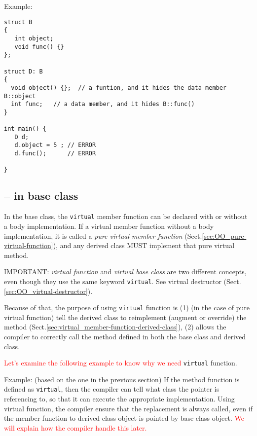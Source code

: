 Example:
\begin{lstlisting}
struct B
{
   int object;
   void func() {}
};

struct D: B
{
  void object() {};  // a funtion, and it hides the data member B::object
  int func;   // a data member, and it hides B::func()
}

int main() {
   D d; 
   d.object = 5 ; // ERROR
   d.func();      // ERROR

}
\end{lstlisting}


\subsection{ -- in base class}
\label{sec:virtual_member-function-in-base-class}

In the base class, the \verb!virtual! member function can be declared with or
without a body implementation. If a virtual member function without a body
implementation, it is called a {\it pure virtual member function}
(Sect.\ref{sec:OO_pure-virtual-function}), and any derived class MUST implement
that pure virtual method.

\begin{mdframed}

IMPORTANT: {\it virtual function} and {\it virtual base class} are two different
concepts, even though they use the same keyword \verb!virtual!. See virtual
destructor (Sect.\ref{sec:OO_virtual-destructor}).
\end{mdframed}

Because of that, the purpose of using \verb!virtual! function is (1) (in the
case of pure virtual function) tell the derived class to reimplement (augment or
override) the method (Sect.\ref{sec:virtual_member-function-derived-class}), (2)
allows the compiler to correctly call the method defined in both the base class
and derived class.

\textcolor{red}{Let's examine the following example to know why we need}
\verb!virtual! function.

Example: (based on the one in the previous section)
If the method function is defined as \verb!virtual!, then the compiler
can tell what class the pointer is referencing to, so that
it can execute the appropriate implementation. Using virtual
function, the compiler ensure that the replacement is always called, even if the
member function to derived-class object is pointed by base-class object.
\textcolor{red}{We will explain how the compiler handle this later.} 

